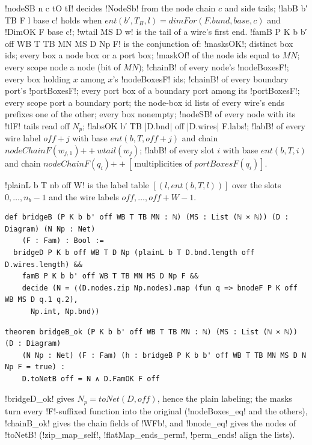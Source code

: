 {\begin{definition}\label{def:boxes-famB}
\lbx!nodeSB n c tO tI! decides \lbx!NodeSb! from the node chain $c$ and side tails; \lbx!labB b′ TB F l base c! holds when $\mathit{ent}(b',T_B,l)=\mathit{dimFor}(F.\mathit{bund},\mathit{base},c)$ and \lbx!DimOK F base c!; \lbx!wtail MS D w! is the tail of a wire's first end. \lbx!famB P K b b′ off WB T TB MN MS D Np F! is the conjunction of: \lbx!masksOK!; distinct box ids; every box a node box or a port box; \lbx!maskOf! of the node ids equal to $\mathit{MN}$; every scope node a node (bit of $\mathit{MN}$); \lbx!chainB! of every node's \lbx!nodeBoxesF!; every box holding $x$ among $x$'s \lbx!nodeBoxesF! ids; \lbx!chainB! of every boundary port's \lbx!portBoxesF!; every port box of a boundary port among its \lbx!portBoxesF!; every scope port a boundary port; the node-box id lists of every wire's ends prefixes one of the other; every box nonempty; \lbx!nodeSB! of every node with its \lbx!tlF! tails read off $N_p$; \lbx!labsOK b′ TB |D.bnd| off |D.wires| F.labs!; \lbx!labB! of every wire label $\mathit{off}+j$ with base $\mathit{ent}(b,T,\mathit{off}+j)$ and chain $\mathit{nodeChainF}(w_{j,1})\mathbin{+\!\!+}\mathit{wtail}(w_j)$; \lbx!labB! of every slot $i$ with base $\mathit{ent}(b,T,i)$ and chain $\mathit{nodeChainF}(q_i)\mathbin{+\!\!+}[\,\text{multiplicities of } \mathit{portBoxesF}(q_i)]$.
\end{definition}

\begin{definition}\label{def:boxes-bridgeB}
\lbx!plainL b T nb off W! is the label table $[(l,\mathit{ent}(b,T,l))]$ over the slots $0,\dots,n_b-1$ and the wire labels $\mathit{off},\dots,\mathit{off}+W-1$.
\begin{lstlisting}[style=leanbox]
def bridgeB (P K b b' off WB T TB MN : ℕ) (MS : List (ℕ × ℕ)) (D : Diagram) (N Np : Net)
    (F : Fam) : Bool :=
  bridgeD P K b off WB T D Np (plainL b T D.bnd.length off D.wires.length) &&
    famB P K b b' off WB T TB MN MS D Np F &&
    decide (N = ⟨(D.nodes.zip Np.nodes).map (fun q => bnodeF P K off WB MS D q.1 q.2),
      Np.int, Np.bnd⟩)
\end{lstlisting}
\end{definition}

\begin{theorem}\label{thm:boxes-bridgeB}
\begin{lstlisting}[style=leanbox]
theorem bridgeB_ok (P K b b' off WB T TB MN : ℕ) (MS : List (ℕ × ℕ)) (D : Diagram)
    (N Np : Net) (F : Fam) (h : bridgeB P K b b' off WB T TB MN MS D N Np F = true) :
    D.toNetB off = N ∧ D.FamOK F off
\end{lstlisting}
\end{theorem}
\noindent \lbx!bridgeD_ok! gives $N_p=\mathit{toNet}(D,\mathit{off})$, hence the plain labeling; the masks turn every \lbx!F!-suffixed function into the original (\lbx!nodeBoxes_eq! and the others), \lbx!chainB_ok! gives the chain fields of \lbx!WFb!, and \lbx!bnode_eq! gives the nodes of \lbx!toNetB! (\lbx!zip_map_self!, \lbx!flatMap_ends_perm!, \lbx!perm_ends! align the lists).

}
